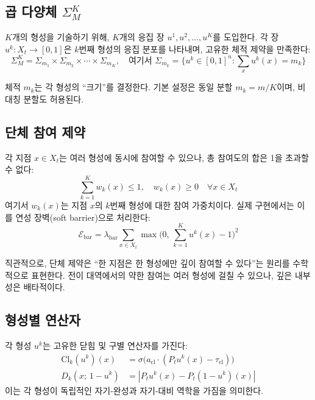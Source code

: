 \subsection{곱 다양체 $\Sigma^K_M$}

$K$개의 형성을 기술하기 위해, $K$개의 응집 장 $u^1, u^2, \ldots, u^K$를 도입한다. 각 장 $u^k : X_t \to [0,1]$은 $k$번째 형성의 응집 분포를 나타내며, 고유한 체적 제약을 만족한다:
\begin{equation}
    \Sigma^K_M = \Sigma_{m_1} \times \Sigma_{m_2} \times \cdots \times \Sigma_{m_K}, \quad \text{여기서 } \Sigma_{m_k} = \Big\{ u^k \in [0,1]^n : \sum_x u^k(x) = m_k \Big\}
    \label{eq:product-manifold}
\end{equation}

체적 $m_k$는 각 형성의 ``크기''를 결정한다. 기본 설정은 동일 분할 $m_k = m/K$이며, 비대칭 분할도 허용된다.

\subsection{단체 참여 제약}

각 지점 $x \in X_t$는 여러 형성에 동시에 참여할 수 있으나, 총 참여도의 합은 1을 초과할 수 없다:
\begin{equation}
    \sum_{k=1}^{K} w_k(x) \leq 1, \quad w_k(x) \geq 0 \quad \forall x \in X_t
    \label{eq:simplex-constraint}
\end{equation}
여기서 $w_k(x)$는 지점 $x$의 $k$번째 형성에 대한 참여 가중치이다. 실제 구현에서는 이를 연성 장벽(soft barrier)으로 처리한다:
\begin{equation}
    \mathcal{E}_{\mathrm{bar}} = \lambda_{\mathrm{bar}} \sum_{x \in X_t} \max\!\Big(0,\, \sum_{k=1}^{K} u^k(x) - 1\Big)^2
    \label{eq:simplex-barrier}
\end{equation}

직관적으로, 단체 제약은 ``한 지점은 한 형성에만 깊이 참여할 수 있다''는 원리를 수학적으로 표현한다. 전이 대역에서의 약한 참여는 여러 형성에 걸칠 수 있으나, 깊은 내부성은 배타적이다.

\subsection{형성별 연산자}

각 형성 $u^k$는 고유한 닫힘 및 구별 연산자를 가진다:
\begin{align}
    \mathrm{Cl}_k(u^k)(x) &= \sigma\!\big(a_{\mathrm{cl}} \cdot (P_t u^k(x) - \tau_{\mathrm{cl}})\big) \label{eq:per-formation-closure} \\
    D_k(x;\, 1 - u^k) &= |P_t u^k(x) - P_t(1 - u^k)(x)| \label{eq:per-formation-distinction}
\end{align}
이는 각 형성이 독립적인 자기-완성과 자기-대비 역학을 가짐을 의미한다.

